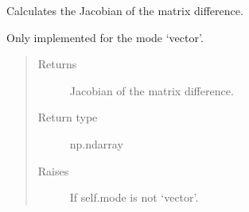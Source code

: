 \documentclass[letterpaper,10pt,english]{sphinxmanual}
\begin{document}
\begin{fulllineitems}
\begin{fulllineitems}
\end{fulllineitems}


\begin{fulllineitems}
\label{\detokenize{qsim:qsim.cost_functions.OperatorMatrixNorm.grad}}
Calculates the Jacobian of the matrix difference.

Only implemented for the mode ‘vector’.
\begin{quote}\begin{description}
\item[{Returns}] \leavevmode
{} \textendash{} Jacobian of the matrix difference.

\item[{Return type}] \leavevmode
np.ndarray

\item[{Raises}] \leavevmode
{} \textendash{} If self.mode is not ‘vector’.

\end{description}\end{quote}

\end{fulllineitems}


\end{fulllineitems}

\end{document}

